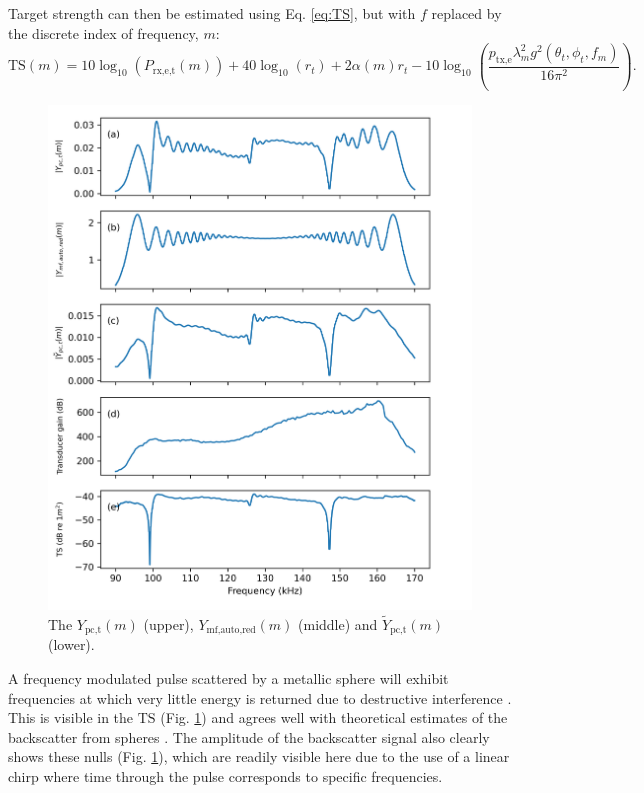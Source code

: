 \documentclass[preprint,12pt,TurnOnLineNumbers]{JASAnew}
\newcommand{\freqsym}{f}
\newcommand{\samplesymf}{m}
\newcommand{\ptxe}{p_{\textrm{tx,e}}}
\newcommand{\ypctargetf}{Y_{\textrm{pc,t}}}
\newcommand{\ypctargetnormf}{\tilde{Y}_{\textrm{pc,t}}}
\newcommand{\ymfautoredf}{Y_{\textrm{mf,auto,red}}}
\newcommand{\prxetf}{P_{\textrm{rx,e,t}}}
\newcommand{\ts}{\textrm{TS}}
\newcommand{\range}{r}
\newcommand{\athw}{\phi}
\newcommand{\along}{\theta}
\newcommand{\gain}{g}
\newcommand{\wlen}{\lambda}
\newcommand{\absorp}{\alpha}
\begin{document}
Target strength can then be estimated using Eq. \ref{eq:TS}, but with $\freqsym$ replaced by the discrete index of frequency, $\samplesymf$:
\begin{equation}
\label{eq:TS_f}
\ts(\samplesymf) = 10\log_{10}(\prxetf(\samplesymf)) + 40\log_{10}(\range_t) + 2\absorp(\samplesymf)\range_t 
- 10\log_{10}\left( \frac{\ptxe \wlen_\samplesymf^2 \gain^2(\along_t,\athw_t,f_\samplesymf)}{16\pi^2} \right).
\end{equation}
%
\begin{figure}
\includegraphics[width=16cm]{Fig_TS}
\caption{\label{fi:SED}The $\ypctargetf(\samplesymf)$ (upper), $\ymfautoredf(\samplesymf)$ (middle) and $\ypctargetnormf(\samplesymf)$ (lower).}
\end{figure}

A frequency modulated pulse scattered by a metallic sphere will exhibit frequencies at which very little energy is returned due to destructive interference \citep{stanton2008}. This is visible in the $\ts$ (Fig. \ref{fi:SED}) and agrees well with theoretical estimates of the backscatter from spheres \citep{maclennan1981}. The amplitude of the backscatter signal also clearly shows these nulls (Fig. \ref{fi:SED}), which are readily visible here due to the use of a linear chirp where time through the pulse corresponds to specific frequencies. 
\end{document}
